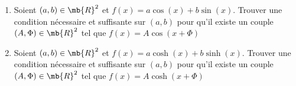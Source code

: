 \exercice

\begin{enumerate}

    \item Soient $(a,b) \in \mb{R}^2$ et $f(x) = a \cos(x) + b \sin(x)$.
Trouver une condition nécessaire et suffisante sur $(a,b)$
pour qu'il existe un couple $(A,\Phi) \in \mb{R}^2$ tel que 
$f(x) = A \cos (x + \Phi)$

    \item Soient $(a,b) \in \mb{R}^2$ et $f(x) = a \cosh(x) + b \sinh(x)$.
Trouver une condition nécessaire et suffisante sur $(a,b)$
pour qu'il existe un couple $(A,\Phi) \in \mb{R}^2$ tel que 
$f(x) = A \cosh (x + \Phi)$
\end{enumerate}


